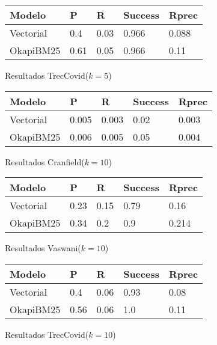 \documentclass[a4paper,10pt,twocolumn]{article}
\begin{document}
    \begin{figure}[h]%
        \begin{tabular}{| l | l | l | l | l|}
            \hline
            Modelo & P & R & Success & Rprec\\ \hline
            Vectorial & 0.4 & 0.03 & 0.966 & 0.088\\
            OkapiBM25 & 0.61 & 0.05 & 0.966 & 0.11\\
        \end{tabular}
        \caption{Resultados TrecCovid($k=5$)}
    \end{figure}

    \begin{figure}[h]%
        \begin{tabular}{| l | l | l | l | l|}
            \hline
            Modelo & P & R & Success & Rprec\\ \hline
            Vectorial & 0.005 & 0.003 & 0.02 & 0.003\\
            OkapiBM25 & 0.006 & 0.005 & 0.05 & 0.004\\
        \end{tabular}
        \caption{Resultados Cranfield($k=10$)}
        \end{figure}

    
        \begin{figure}[h]%
            \begin{tabular}{| l | l | l | l | l|}
                \hline
                Modelo & P & R & Success & Rprec\\ \hline
                Vectorial & 0.23 & 0.15 & 0.79 & 0.16\\
                OkapiBM25 & 0.34 & 0.2 & 0.9 & 0.214\\
            \end{tabular}
            \caption{Resultados Vaswani($k=10$)}
        \end{figure}

        \begin{figure}[!htb]%
            \begin{tabular}{| l | l | l | l | l|}
                \hline
                Modelo & P & R & Success & Rprec\\ \hline
                Vectorial & 0.4 & 0.06 & 0.93 & 0.08\\
                OkapiBM25 & 0.56 & 0.06 & 1.0 & 0.11\\
            \end{tabular}
            \caption{Resultados TrecCovid($k=10$)}
        \end{figure}
        
\end{document}
